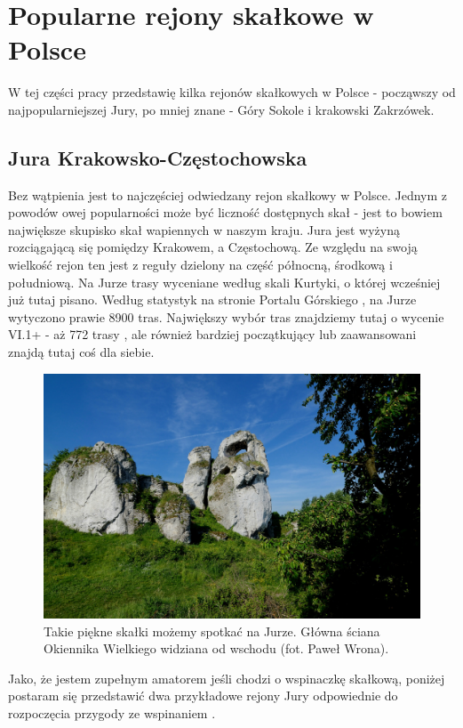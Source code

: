 \documentclass{article}
\begin{document}
\section{Popularne rejony skałkowe w Polsce}
\lettrine[lines=2]{W}{} tej części pracy przedstawię kilka rejonów skałkowych w Polsce - począwszy od najpopularniejszej Jury, po mniej znane - Góry Sokole i krakowski Zakrzówek.

\subsection{Jura Krakowsko-Częstochowska}
Bez wątpienia jest to najczęściej odwiedzany rejon skałkowy w Polsce. Jednym z powodów owej popularności może być liczność dostępnych skał - jest to bowiem największe skupisko skał wapiennych w naszym kraju. Jura jest wyżyną rozciągającą się pomiędzy Krakowem, a Częstochową. Ze względu na swoją wielkość rejon ten jest z reguły dzielony na część północną, środkową i południową. Na Jurze trasy wyceniane według skali Kurtyki, o której wcześniej już tutaj pisano. Według statystyk na stronie Portalu Górskiego \cite{topo-jura}, na Jurze wytyczono prawie 8900 tras. Największy wybór tras znajdziemy tutaj o wycenie VI.1+ - aż 772 trasy \cite{topo-jura}, ale również bardziej początkujący lub zaawansowani znajdą tutaj coś dla siebie.

\begin{figure}[!htbp]
	\begin{center}
		\includegraphics[width=0.75\linewidth]{images/jura-okiennik.eps}
	\end{center}
	\caption{Takie piękne skałki możemy spotkać na Jurze. Główna ściana Okiennika Wielkiego widziana od wschodu (fot. Paweł Wrona)\cite{jura-okiennik}.}
	\label{}
\end{figure}

Jako, że jestem zupełnym amatorem jeśli chodzi o wspinaczkę skałkową, poniżej postaram się przedstawić dwa przykładowe rejony Jury odpowiednie do rozpoczęcia przygody ze wspinaniem \cite{jura-okiennik}. 
\end{document}
